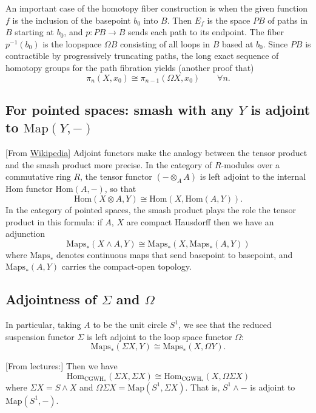 \begin{remark}
\begin{definition}
	An important case of the homotopy fiber construction is when the given function $f$ is the inclusion of the basepoint $b_0$ into $B$. Then $E_{f}$ is the space $PB$ of paths in $B$ starting at $b_{0}$,  and $p:PB\to B$ sends each path to its endpoint. The fiber $p^{-1}(b_{0})$ is the loopspace $\Omega B$ consisting of all loops in  $B$ based at $b_{0}$. Since $PB$ is contractible by progressively truncating paths, the long exact sequence of homotopy groups for the path fibration yields (another proof that)
	\[\pi_{n}(X,x_{0})\cong \pi_{n-1}(\Omega X,x_{0})\qquad \forall n.\]
\end{definition}

\subsection{For pointed spaces: smash with any \texorpdfstring{$Y$}{Y}		 is adjoint to  \texorpdfstring{$\text{Map}(Y,-)$}{Map(Y,-)}}
[From \href{https://en.wikipedia.org/wiki/Smash_product#}{Wikipedia}]
Adjoint functors make the analogy between the tensor product and the smash product more precise. In the category of $R$-modules over a commutative ring $R$, the tensor functor $(-\otimes_{A} A)$ is left adjoint to the internal Hom functor $\text{Hom}(A,-)$, so that
\[\text{Hom}(X\otimes A,Y)\cong \text{Hom}(X,\text{Hom}(A,Y)).\]
In the category of pointed spaces, the smash product plays the role the tensor product in this formula: if $A$, $X$ are compact Hausdorff then we have an adjunction
\[\text{Maps}_{*}(X\wedge A,Y)\cong \text{Maps}_{*}(X,\text{Maps}_{*}(A,Y))\]
where $\text{Maps}_{*}$ denotes continuous maps that send basepoint to basepoint, and $\text{Maps}_{*}(A,Y)$ carries the compact-open topology.

\subsection{Adjointness of \texorpdfstring{$\Sigma$}{Σ} and \texorpdfstring{$\Omega$}{Ω}}
In particular, taking $A$ to be the unit circle $S^{1}$, we see that the reduced suspension functor $\Sigma$ is left adjoint to the loop space functor $\Omega$:
\[\text{Maps}_{*}(\Sigma X,Y)\cong \text{Maps}_{*}(X,\Omega Y).\]

[From lectures:] Then we have
\[\text{Hom}_{\text{CGWH}_*}(\Sigma X,\Sigma X)\cong\text{Hom}_{\text{CGWH}_*}(X,\Omega\Sigma X)\]
where $\Sigma X=S\wedge X$ and $\Omega\Sigma X=\text{Map}(S^1,\Sigma X)$. That is, $S^1\wedge-$ is adjoint to $\text{Map}(S^1,-)$.


\end{remark}
